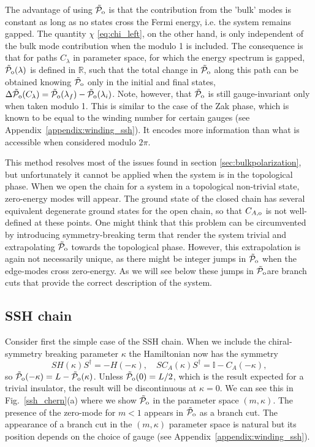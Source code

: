 \documentclass[twocolumn,amsmath,longbibliography,amssymb,superscriptaddress]{revtex4-1}
\newcommand{\tpo}{\tilde{\mathcal{P}}_{\rm o}}
\begin{document}
The advantage of using $\tpo$ is that the contribution from the 'bulk' modes is constant as long as no states cross the Fermi energy, i.e. the system remains gapped.  
The quantity $\chi$ \eqref{eq:chi_left}, on the other hand, is only independent of the bulk mode contribution when the modulo 1 is included. 
The consequence is that for paths $C_\lambda$ in parameter space, for which the energy spectrum is gapped, $\tpo (\lambda)$ is defined in $\mathbb{R}$, such that the total change in $\tpo$ along this path can be obtained knowing $\tpo$ only in the initial and final states, $\Delta \tpo ({C_\lambda}) = \tpo(\lambda_f) - \tpo(\lambda_i)$. Note, however, that $\tpo$ is still gauge-invariant only when taken modulo 1. This is similar to the case of the Zak phase, which is known to be equal to the winding number for certain gauges (see Appendix~\ref{appendix:winding_ssh}). It encodes more information than what is accessible when considered modulo $2\pi$.

This method resolves most of the issues found in section \ref{sec:bulkpolarization}, but unfortunately it cannot be applied when the system is in the topological phase. When we open the chain for a system in a topological non-trivial state, zero-energy modes will appear. The ground state of the closed chain has several equivalent degenerate ground states for the open chain, so that $C_{A,\rm o}$ is not well-defined at these points. 
One might think that this problem can be circumvented by introducing symmetry-breaking term that render the system trivial and extrapolating $\tpo$ towards the topological phase. 
However, this extrapolation is again not necessarily unique, as 
there might be integer jumps in $\tpo$ when the edge-modes cross zero-energy. 
As we will see below these jumps in $\tpo$are branch cuts that provide the correct description of the system. 


\subsection{SSH chain}

Consider first the simple case of the SSH chain. When we include the chiral-symmetry breaking parameter $\kappa$ the Hamiltonian now has the symmetry
\begin{equation}\label{eq:sym}
SH(\kappa)S^\dagger = -H(-\kappa), \quad S C_A(\kappa) S^\dagger = \mathbb{I}-C_A(-\kappa),
\end{equation}
so $\tpo(-\kappa) = L-\tpo(\kappa)$. Unless $\tpo(0) = L/2$, which is the result expected for a trivial insulator, the result will be discontinuous at $\kappa = 0$. We can see this in Fig.~\ref{ssh_chern}(a) where we show $\tpo$ in the parameter space $(m,\kappa)$. The presence of the zero-mode for $m<1$ appears in $\tpo$ as a branch cut. The appearance of a branch cut in the $(m,\kappa)$ parameter space is natural but its position depends on the choice of gauge (see Appendix~\ref{appendix:winding_ssh}).
\end{document}
